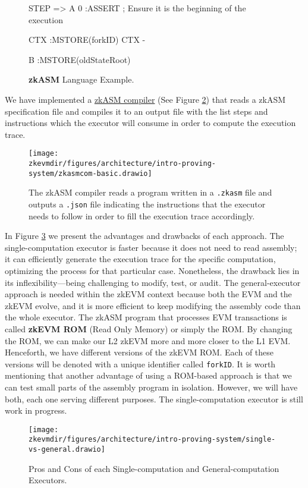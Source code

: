 \begin{figure}[H]
\begin{zkasm}
STEP => A
0                                   :ASSERT ; Ensure it is the beginning of the execution

CTX                                 :MSTORE(forkID)
CTX - %

B                                   :MSTORE(oldStateRoot)
\end{zkasm}
\caption{\textbf{zkASM} Language Example. }
\label{fig:zkasm-example}
\end{figure}

We have implemented a \href{https://github.com/0xPolygonHermez/zkasmcom}{zkASM compiler} (See Figure \ref{fig:zkasmcom}) that reads a zkASM specification file and compiles it to an output file with the list steps and instructions which the executor will consume in order to compute the execution trace.

\begin{figure}[H]
\centering
\texttt{[image: \\zkevmdir/figures/architecture/intro-proving-system/zkasmcom-basic.drawio]}
\caption{The zkASM compiler reads a program written in a \texttt{.zkasm} file and outputs a \texttt{.json} file indicating the instructions that the executor needs to follow in order to fill the execution trace accordingly. }
\label{fig:zkasmcom}
\end{figure}

In Figure \ref{fig:single-vs-general} we present the advantages and drawbacks of each approach. The single-computation executor is faster because it does not need to read assembly; it can efficiently generate the execution trace for the specific computation, optimizing the process for that particular case. Nonetheless, the drawback lies in its inflexibility—being challenging to modify, test, or audit. The general-executor approach is needed within the zkEVM context because both the EVM and the zkEVM evolve, and it is more efficient to keep modifying the assembly code than the whole executor. The zkASM program that processes EVM transactions is called \textbf{zkEVM ROM} (Read Only Memory) or simply the ROM. By changing the ROM, we can make our L2 zkEVM more and more closer to the L1 EVM. Henceforth, we have different versions of the zkEVM ROM. Each of these versions will be denoted with a unique identifier called \texttt{forkID}. It is worth mentioning that another advantage of using a ROM-based approach is that we can test small parts of the assembly program in isolation. However, we will have both, each one serving different purposes. The single-computation executor is still work in progress.


\begin{figure}[H]
\centering
\texttt{[image: \\zkevmdir/figures/architecture/intro-proving-system/single-vs-general.drawio]}
\caption{Pros and Cons of each Single-computation and General-computation Executors.}
\label{fig:single-vs-general}
\end{figure}
